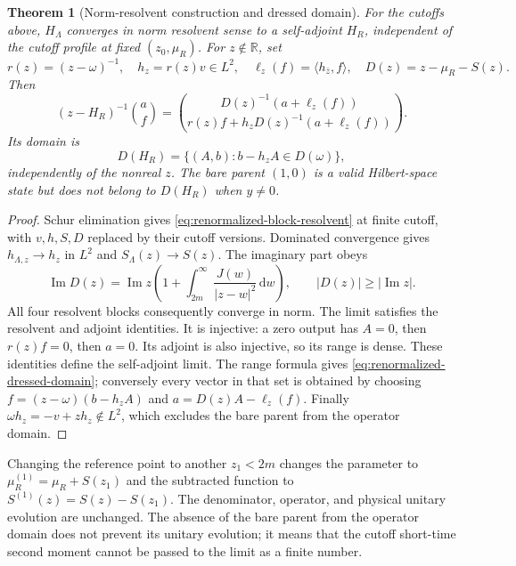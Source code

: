 \documentclass[11pt,a4paper,oneside]{book}
\theoremstyle{plain}
\newtheorem{theorem}{Theorem}[chapter]
\theoremstyle{definition}
\theoremstyle{remark}
\newcommand{\R}{\mathbb R}
\newcommand{\dd}{\mathrm d}
\newcommand{\src}[2]{\cite{#1}}
\begin{document}
\begin{theorem}[Norm-resolvent construction and dressed domain]
\label{thm:one-parent-renormalized}
For the cutoffs above, $H_\Lambda$ converges in norm resolvent sense to
a self-adjoint $H_R$, independent of the cutoff profile at fixed
$(z_0,\mu_R)$.  For $z\notin\R$, set
\begin{equation}
 r(z)=(z-\omega)^{-1},\quad h_z=r(z)v\in L^2,\quad
 \ell_z(f)=\langle h_{\bar z},f\rangle,\quad
 D(z)=z-\mu_R-S(z).
 \label{eq:renormalized-resolvent-data}
\end{equation}
Then
\begin{equation}
 (z-H_R)^{-1}\binom a f=
 \binom{D(z)^{-1}(a+\ell_z(f))}
       {r(z)f+h_zD(z)^{-1}(a+\ell_z(f))}.
 \label{eq:renormalized-block-resolvent}
\end{equation}
Its domain is
\begin{equation}
 D(H_R)=\{(A,b):b-h_zA\in D(\omega)\},
 \label{eq:renormalized-dressed-domain}
\end{equation}
independently of the nonreal $z$.  The bare parent $(1,0)$ is a valid
Hilbert-space state but does not belong to $D(H_R)$ when $y\ne0$.
\end{theorem}
\begin{proof}
Schur elimination gives \eqref{eq:renormalized-block-resolvent} at
finite cutoff, with $v,h,S,D$ replaced by their cutoff versions.
Dominated convergence gives $h_{\Lambda,z}\to h_z$ in $L^2$ and
$S_\Lambda(z)\to S(z)$.  The imaginary part obeys
\[
 \operatorname{Im}D(z)=\operatorname{Im}z
 \left(1+\int_{2m}^\infty\frac{J(w)}{|z-w|^2}\,\dd w\right),
 \qquad |D(z)|\ge|\operatorname{Im}z|.
\]
All four resolvent blocks consequently converge in norm.  The limit
satisfies the resolvent and adjoint identities.  It is injective:
a zero output has $A=0$, then $r(z)f=0$, then $a=0$.  Its adjoint is
also injective, so its range is dense.  These identities define the
self-adjoint limit.  The range formula gives
\eqref{eq:renormalized-dressed-domain}; conversely every vector in
that set is obtained by choosing $f=(z-\omega)(b-h_zA)$ and
$a=D(z)A-\ell_z(f)$.  Finally
$\omega h_z=-v+zh_z\notin L^2$, which excludes the bare parent from
the operator domain.
\end{proof}
\src{R20}{thm:v20v47-limit,thm:v20v47-operator,prop:v20v47-domain}

Changing the reference point to another $z_1<2m$ changes the parameter
to $\mu_R^{(1)}=\mu_R+S(z_1)$ and the subtracted function to
$S^{(1)}(z)=S(z)-S(z_1)$.  The denominator, operator, and physical
unitary evolution are unchanged.  The absence of the bare parent from
the operator domain does not prevent its unitary evolution; it means
that the cutoff short-time second moment cannot be passed to the
limit as a finite number.\src{R20}{cor:v20v47-reference}
\end{document}
